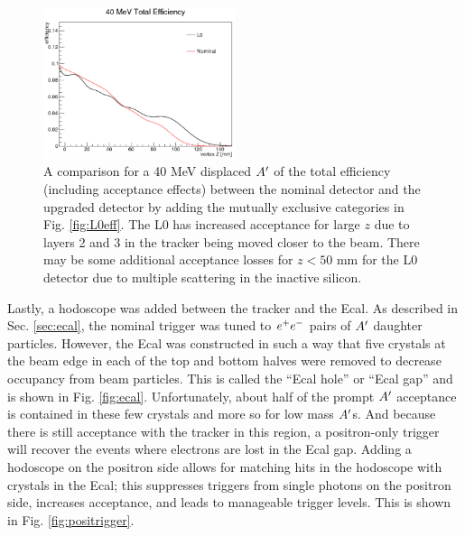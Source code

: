 \begin{figure}
    \centering
    \includegraphics[width=0.5\textwidth]{figs/upgrades/40MeV_tot_eff.png}
    \caption{A comparison for a 40 MeV displaced $A^\prime$ of the total efficiency (including acceptance effects) between the nominal detector and the upgraded detector by adding the mutually exclusive categories in Fig. \ref{fig:L0eff}. The L0 has increased acceptance for large $z$ due to layers 2 and 3 in the tracker being moved closer to the beam. There may be some additional acceptance losses for $z<50$ mm for the L0 detector due to multiple scattering in the inactive silicon.}
    \label{fig:40MeVeff}
\end{figure}

Lastly, a hodoscope was added between the tracker and the Ecal. As described in Sec. \ref{sec:ecal}, the nominal trigger was tuned to $e^{+}e^{-}$ pairs of $A^\prime$ daughter particles. However, the Ecal was constructed in such a way that five crystals at the beam edge in each of the top and bottom halves were removed to decrease occupancy from beam particles. This is called the ``Ecal hole'' or ``Ecal gap'' and is shown in Fig. \ref{fig:ecal}. Unfortunately, about half of the prompt $A^\prime$ acceptance is contained in these few crystals and more so for low mass $A^\prime$s. And because there is still acceptance with the tracker in this region, a positron-only trigger will recover the events where electrons are lost in the Ecal gap. Adding a hodoscope on the positron side allows for matching hits in the hodoscope with crystals in the Ecal; this suppresses triggers from single photons on the positron side, increases acceptance, and leads to manageable trigger levels. This is shown in Fig. \ref{fig:positrigger}.

